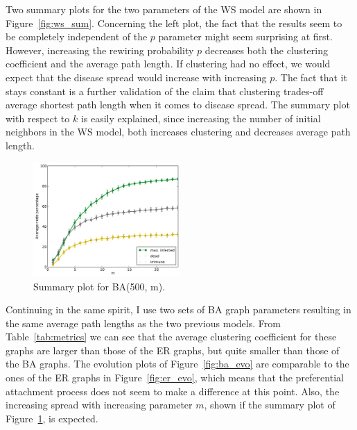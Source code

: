 \documentclass[11pt]{article} %
\begin{document}
Two summary plots for the two parameters of the WS model are shown in
Figure~\ref{fig:ws_sum}. Concerning the left plot, the fact that the
results seem to be completely independent of the $p$ parameter might
seem surprising at first.
However, increasing the rewiring probability $p$ decreases both the
clustering coefficient and the average path length. If clustering
had no effect, we would expect that the disease spread would increase
with increasing $p$. The fact that it stays constant is a further validation
of the claim that clustering trades-off average shortest path length
when it comes to disease spread. The summary plot with respect to $k$
is easily explained, since increasing the number of initial neighbors
in the WS model, both increases clustering and decreases average
path length.

\begin{figure}
  \centering
  \vspace{-15pt}
  \includegraphics[width=0.5\textwidth]{figures/sum_BA_500_m}
  \vspace{-17pt}
  \caption{Summary plot for BA(500, m).}
  \label{fig:ba_sum}
\end{figure}

Continuing in the same spirit, I use two sets of BA graph parameters resulting
in the same average
path lengths as the two previous models. From Table~\ref{tab:metrics}
we can see that the average clustering coefficient for these graphs
are larger than those of the ER graphs, but quite smaller than those
of the BA graphs. The evolution plots of Figure~\ref{fig:ba_evo}
are comparable to the ones of the ER graphs in Figure~\ref{fig:er_evo},
which means that the preferential attachment process does not seem
to make a difference at this point. Also, the increasing spread with
increasing parameter $m$, shown if the summary plot of
Figure~\ref{fig:ba_sum}, is expected.
\end{document}
